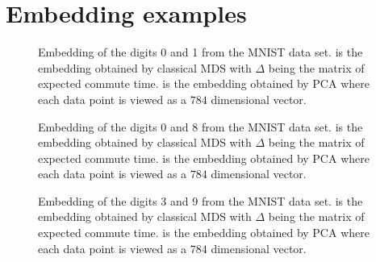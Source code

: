 \section{Embedding examples}
\label{sec:embedding-examples}
\begin{figure}[htbp]
  \begin{center}
  \caption{Embedding of the digits 0 and 1 from the MNIST data
    set.  is the embedding obtained by
    classical MDS with $\Delta$ being the matrix of expected commute
    time.  is the embedding obtained by
    PCA where each data point is viewed as a $784$ dimensional vector.
    }
  \label{fig:mnist01}
  \end{center}
\end{figure}    

\begin{figure}[htbp]
  \begin{center}
  \caption{Embedding of the digits 0 and 8 from the MNIST data
    set.  is the embedding obtained by
    classical MDS with $\Delta$ being the matrix of expected commute
    time.  is the embedding obtained by
    PCA where each data point is viewed as a $784$ dimensional vector.
    }
  \label{fig:mnist08}
  \end{center}
\end{figure}    

\begin{figure}[htbp]
  \begin{center}
  \caption{Embedding of the digits 3 and 9 from the MNIST data
    set.  is the embedding obtained by
    classical MDS with $\Delta$ being the matrix of expected commute
    time.  is the embedding obtained by
    PCA where each data point is viewed as a $784$ dimensional vector.
    }
  \label{fig:mnist39}
  \end{center}
\end{figure}    

